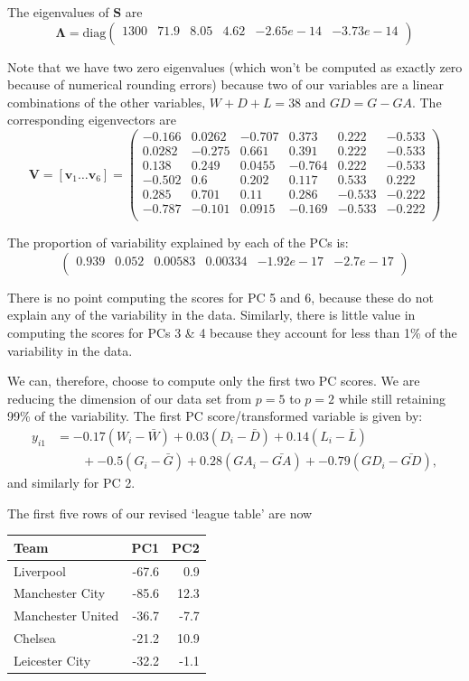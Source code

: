 \documentclass[
]{book}
\theoremstyle{definition}
\theoremstyle{definition}
\theoremstyle{definition}
\theoremstyle{definition}
\theoremstyle{remark}
\begin{document}
The eigenvalues of \(\mathbf S\) are
\[\boldsymbol \Lambda= \text{diag}\begin{pmatrix}1300&71.9&8.05&4.62&-2.65e-14&-3.73e-14 \\\end{pmatrix}\]

Note that we have two zero eigenvalues (which won't be computed as exactly zero because of numerical rounding errors) because two of our variables are a linear combinations of the other variables, \(W+D+L = 38\) and \(GD=G-GA\). The corresponding eigenvectors are
\[\mathbf V= [\mathbf v_1 \ldots \mathbf v_6] =\begin{pmatrix}-0.166&0.0262&-0.707&0.373&0.222&-0.533 \\0.0282&-0.275&0.661&0.391&0.222&-0.533 \\0.138&0.249&0.0455&-0.764&0.222&-0.533 \\-0.502&0.6&0.202&0.117&0.533&0.222 \\0.285&0.701&0.11&0.286&-0.533&-0.222 \\-0.787&-0.101&0.0915&-0.169&-0.533&-0.222 \\\end{pmatrix}\]

The proportion of variability explained by each of the PCs is:
\[
\begin{pmatrix}0.939&0.052&0.00583&0.00334&-1.92e-17&-2.7e-17 \\\end{pmatrix}
\]

There is no point computing the scores for PC 5 and 6, because these do not explain any of the variability in the data. Similarly, there is little value in computing the scores for PCs 3 \& 4 because they account for less than 1\% of the variability in the data.

We can, therefore, choose to compute only the first two PC scores. We are reducing the dimension of our data set from \(p=5\) to \(p=2\) while still retaining 99\% of the variability. The first PC score/transformed variable is given by:
\begin{align*}
y_{i1} &= -0.17(W_i-\bar{W}) +0.03(D_i-\bar{D}) +0.14(L_i-\bar{L})\\
& \qquad +-0.5(G_i-\bar{G}) +0.28(GA_i-\bar{GA})+-0.79(GD_i-\bar{GD}),
\end{align*}
and similarly for PC 2.

The first five rows of our revised `league table' are now

\begin{table}
\centering
\begin{tabular}{lrr}
\toprule
Team & PC1 & PC2\\
\midrule
Liverpool & -67.6 & 0.9\\
Manchester City & -85.6 & 12.3\\
Manchester United & -36.7 & -7.7\\
Chelsea & -21.2 & 10.9\\
Leicester City & -32.2 & -1.1\\
\bottomrule
\end{tabular}
\end{table}
\end{document}
